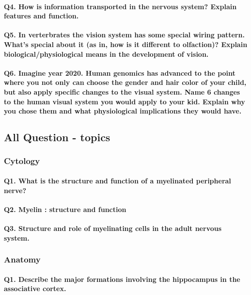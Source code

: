 \documentclass[12pt,article,oneside,a4paper]{memoir}
\begin{document}
\paragraph{Q4. How is information transported in the nervous system? Explain features and function.}
\paragraph{Q5. In verterbrates the vision system has some special wiring pattern. What's special about it (as in, how is it different to olfaction)? Explain biological/physiological means in the development of vision.}
\paragraph{Q6. Imagine year 2020. Human genomics has advanced to the point where you not only can choose the gender and hair color of your child, but also apply specific changes to the visual system. Name 6 changes to the human visual system you would apply to your kid. Explain why you chose them and what physiological implications they would have.}

\subsection{All Question - topics}
\subsubsection{Cytology}
\paragraph{Q1. What is the structure and function of a myelinated peripheral nerve?}
\paragraph{Q2. Myelin : structure and function}
\paragraph{Q3. Structure and role of myelinating cells in the adult nervous system.}

\subsubsection{Anatomy}
\paragraph{Q1. Describe the major formations involving the hippocampus in the associative cortex.}
\end{document}
